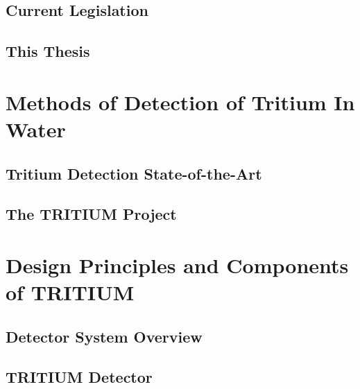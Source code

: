 \documentclass[12pt,a4paper]{book}
\begin{document}
	\section{Current Legislation}\label{sec:Legislation}
	 
	
	\section{This Thesis}\label{sec:ThisThesis}
	
	\newpage
	
\chapter{Methods of Detection of Tritium In Water}\label{chap:TritiumDetection}
	
	\section{Tritium Detection State-of-the-Art}\label{sec:StateOfTheArt}
	
	
	\section{The TRITIUM Project}\label{sec:TritiumProject}
	
	\newpage	
	
\chapter{Design Principles and Components of TRITIUM}\label{chap:DesignPrinciples}
	\section{Detector System Overview}\label{sec:MonitorOverview}
	 
	
	\section{TRITIUM Detector}\label{sec:TritiumDectectorIntro}
	 
	
\end{document}
